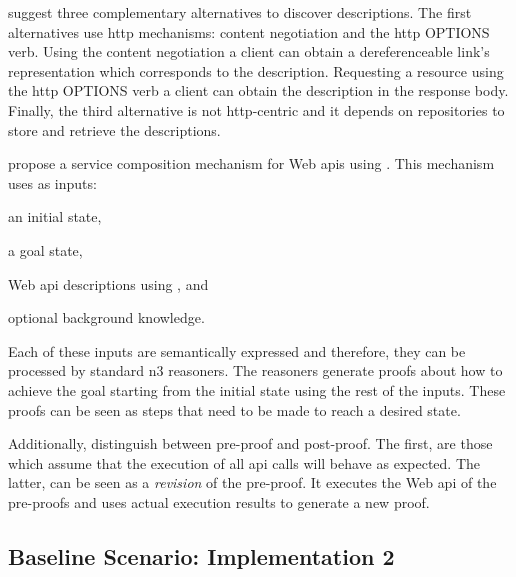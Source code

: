 \citet{verborgh_functional_2012} suggest three complementary alternatives to discover descriptions.
The first alternatives use \ac{http} mechanisms: content negotiation and the \ac{http} OPTIONS verb.
Using the content negotiation a client can obtain a dereferenceable link's representation which corresponds to the description. %
Requesting a resource using the \ac{http} OPTIONS verb a client can obtain the description in the response body.
Finally, the third alternative is not \ac{http}-centric and it depends on repositories to store and retrieve the descriptions.


\citet{verborgh_ijcs_2014} propose a service composition mechanism for Web \acp{api} using \restdesc{}.
This mechanism uses as inputs:
\begin{enumerate*}[label=\itshape(\arabic*\upshape)]
  \item an initial state,
  \item a goal state,
  \item Web \ac{api} descriptions using \restdesc{}, and
  \item optional background knowledge.
\end{enumerate*}
Each of these inputs are semantically expressed and therefore, they can be processed by standard \ac{n3} reasoners.
The reasoners generate proofs about how to achieve the goal starting from the initial state using the rest of the inputs.
These proofs can be seen as steps that need to be made to reach a desired state.


Additionally, \citet{verborgh_ijcs_2014} distinguish between pre-proof and post-proof.
The first, are those which assume that the execution of all \acs{api} calls will behave as expected.
The latter, can be seen as a \emph{revision} of the pre-proof.
It executes the Web \acs{api} of the pre-proofs and uses actual execution results to generate a new proof.


\subsection{Baseline Scenario: Implementation 2}
\label{sec:actuation_scn2}
\newcommand{\implRest}{\emph{Implementation 2}}

